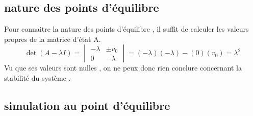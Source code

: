 \documentclass[11pt,a4paper]{article}
\begin{document}
\subsection{nature des points d'équilibre}
Pour connaitre la nature des points d'équilibre , il suffit de calculer les valeurs propres de la matrice d'état A.
$$
\det(A - \lambda I) = 
\begin{vmatrix}
-\lambda &\pm v_0 \\
0 & -\lambda
\end{vmatrix}
= (-\lambda)(-\lambda) - (0)(v_0) = \lambda^2
$$
Vu que ses valeurs sont nulles , on ne peux donc rien conclure concernant la stabilité du système .

\subsection{simulation au point d'équilibre}
\end{document}
